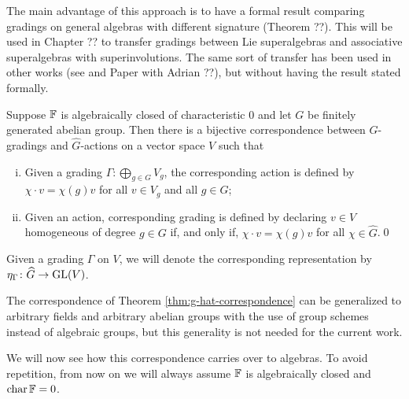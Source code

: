 The main advantage of this approach is to have a formal result comparing gradings on general algebras with different signature (Theorem ??). 
This will be used in Chapter ?? to transfer gradings between Lie superalgebras and associative superalgebras with superinvolutions. 
The same sort of transfer has been used in other works (see \cite{livromicha} and Paper with Adrian ??), but without having the result stated formally.


\begin{thm}\label{thm:g-hat-correspondence}
    Suppose $\mathbb{F}$ is algebraically closed of characteristic $0$ and let $G$ be finitely generated abelian group. 
    Then there is a bijective correspondence between $G$-gradings and $\widehat G$-actions on a vector space $V$ such that
    \begin{enumerate}[(i)]
        \item Given a grading $\Gamma: \bigoplus_{g\in G} V_g$, the corresponding action is defined by $\chi\cdot v = \chi(g) v$ for all $v\in V_g$ and all $g\in G$;
        \item Given an action, corresponding grading is defined by declaring $v\in V$ homogeneous of degree $g\in G$ if, and only if, $\chi\cdot v = \chi(g) v$ for all $\chi \in \widehat G$.\qed
    \end{enumerate}
\end{thm}

\begin{notation}
    Given a grading $\Gamma$ on $V$, we will denote the corresponding representation by $\eta_\Gamma\colon \widehat G \to \operatorname{GL}(V)$.
\end{notation}

\begin{remark}
    The correspondence of Theorem \ref{thm:g-hat-correspondence} can be generalized to arbitrary fields and arbitrary abelian groups with the use of group schemes instead of algebraic groups, but this generality is not needed for the current work.
\end{remark}

We will now see how this correspondence carries over to algebras. 
To avoid repetition, from now on we will always assume $\mathbb{F}$ is algebraically closed and $\operatorname{char} \mathbb{F} = 0$.



